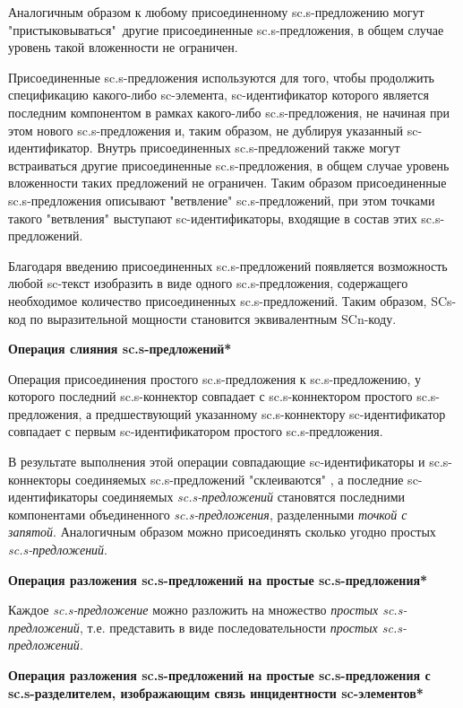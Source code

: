 \begin{textitemize}
{		Аналогичным образом к любому присоединенному sc.s-предложению могут "пристыковываться"\ другие присоединенные sc.s-предложения, в общем случае уровень такой вложенности не ограничен.
		
		Присоединенные sc.s-предложения используются для того, чтобы продолжить спецификацию какого-либо sc-элемента, sc-идентификатор которого является последним компонентом в рамках какого-либо sc.s-предложения, не начиная при этом нового sc.s-предложения и, таким образом, не дублируя указанный \mbox{sc-идентификатор}. Внутрь присоединенных sc.s-предложений также могут встраиваться другие присоединенные sc.s-предложения, в общем случае уровень вложенности таких предложений не ограничен. Таким образом присоединенные sc.s-предложения описывают "ветвление"{} sc.s-предложений, при этом точками такого "ветвления"{} выступают sc-идентификаторы, входящие в состав этих sc.s-предложений.
		
		Благодаря введению присоединенных sc.s-предложений появляется возможность любой sc-текст изобразить в виде одного sc.s-предложения, содержащего необходимое количество присоединенных sc.s-предложений. Таким образом, SCs-код по выразительной мощности становится эквивалентным SCn-коду.}
	
	\item{\textbf{Операция слияния sc.s-предложений*}
		
		Операция присоединения простого sc.s-предложения к sc.s-предложению, у которого последний sc.s-коннектор совпадает с sc.s-коннектором простого sc.s-предложения, а предшествующий указанному sc.s-коннектору sc-идентификатор совпадает с первым sc-идентификатором простого sc.s-предложения.
		
		В результате выполнения этой операции совпадающие sc-идентификаторы и sc.s-коннекторы соединяемых sc.s-предложений "склеиваются"{} , а последние sc-идентификаторы соединяемых \textit{sc.s-предложений} становятся последними компонентами объединенного \textit{sc.s-предложения},
		разделенными \textit{точкой с запятой}. Аналогичным образом можно присоединять сколько угодно простых \textit{sc.s-предложений}.}
	
	\item{\textbf{Операция разложения sc.s-предложений на простые sc.s-предложения*}
		
		Каждое \textit{sc.s-предложение} можно разложить на множество \textit{простых sc.s-предложений}, т.е. представить в виде последовательности \textit{простых sc.s-предложений}.}
	
	\item{\textbf{Операция разложения sc.s-предложений на простые sc.s-предложения с sc.s-разделителем, изображающим связь инцидентности sc-элементов*}
		
}
\end{textitemize}
